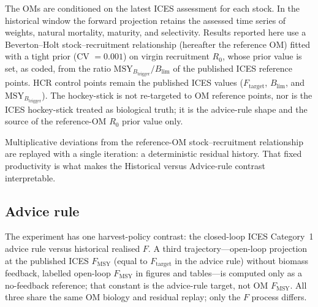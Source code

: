 \documentclass[11pt,a4paper]{article}
\newcommand{\Fmsy}{F_{\mathrm{MSY}}}
\newcommand{\Blim}{B_{\lim}}
\newcommand{\Btrig}{\mathrm{MSY}_{B_{\mathrm{trigger}}}}
\newcommand{\Ftar}{F_{\mathrm{target}}}
\begin{document}
The OMs are conditioned on the latest ICES assessment for each stock. In the historical window the forward projection retains the assessed time series of weights, natural mortality, maturity, and selectivity. Results reported here use a Beverton--Holt stock--recruitment relationship
\citep{beverton1957dynamics} (hereafter the reference OM) fitted with a
tight prior (CV $=0.001$) on virgin recruitment $R_0$, whose prior value
is set, as coded, from the ratio $\Btrig/\Blim$ of the published ICES
reference points.
HCR control points remain the published ICES values ($\Ftar$, $\Blim$,
and $\Btrig$). The hockey-stick is not re-targeted to OM reference
points, nor is the ICES hockey-stick treated as biological truth; it is
the advice-rule shape and the source of the reference-OM $R_0$ prior
value only.

Multiplicative deviations from the reference-OM stock--recruitment
relationship are replayed with a single iteration: a deterministic
residual history. That fixed productivity is what makes the Historical
versus Advice-rule contrast interpretable.

\subsection{Advice rule}
\label{sec:hcr}

The experiment has one harvest-policy contrast: the closed-loop ICES
Category~1 advice rule versus historical realised $F$. A third
trajectory---open-loop projection at the published ICES
$F_{\mathrm{MSY}}$ (equal to $\Ftar$ in the advice rule) without
biomass feedback, labelled open-loop $\Fmsy$ in figures and tables---is
computed only as a no-feedback reference; that constant is the
advice-rule target, not OM $\Fmsy$. All three share the same OM biology
and residual replay; only the $F$ process differs.
\end{document}

